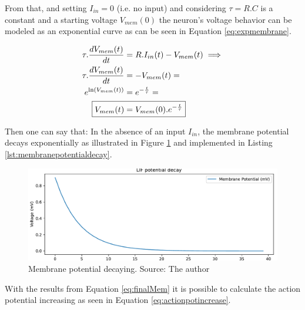 		\par From that, and setting $I_{in} = 0$ (i.e. no input) and considering $\tau = R.C$ is a constant and a starting voltage $V_{mem}(0)$ the neuron's voltage behavior can be modeled as an exponential curve as can be seen in Equation \ref{eq:expmembrane}.
		
		\begin{equation}
			\label{eq:expmembrane}
			\begin{aligned}
				\tau.\dfrac{dV_{mem}(t)}{dt} &= R.I_{in}(t) - V_{mem}(t) \implies \\
				\tau.\dfrac{dV_{mem}(t)}{dt} &= -V_{mem}(t) = \\
				e^{\ln(V_{mem}(t))} &= e^{-\frac{t}{\tau}} = \\
				\Aboxed{V_{mem}(t) &= V_{mem}(0).e^{-\frac{t}{\tau}}}
			\end{aligned}
		\end{equation}
		
		\par Then one can say that: In the absence of an input $I_{in}$, the membrane potential decays exponentially as illustrated in Figure \ref{fig:membranepotentialdecay} and implemented in Listing \ref{lst:membranepotentialdecay}.
		
		
		
		\begin{figure}[H]
			\centering
			\includegraphics[width=\linewidth]{images/membranePotentialDecay}
			\caption{Membrane potential decaying. Source: The author}
			\label{fig:membranepotentialdecay}
		\end{figure}
		
		\par With the results from Equation \ref{eq:finalMem} it is possible to calculate the action potential increasing as seen in Equation \ref{eq:actionpotincrease}.
		
